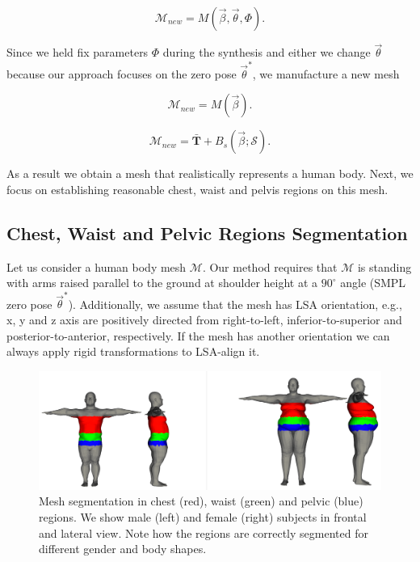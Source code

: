 \documentclass[runningheads, orivec]{llncs}
\begin{document}
\begin{equation}\label{eq:gen_mesh}
\mathcal{M}_{new} = M(\vec{\beta}, \vec{\theta}, \Phi).
\end{equation}

Since we held fix parameters $\Phi$ during the synthesis and either we change 
$\vec{\theta}$ because our approach focuses on the zero pose $\vec{\theta}^*$, 
we manufacture a new mesh

\begin{equation}\label{eq:gen_mesh_only_shape}
\mathcal{M}_{new} = M(\vec{\beta}).
\end{equation}

\begin{equation}\label{eq:gen_new_mesh}
\mathcal{M}_{new} = \mathbf{\bar{T}} + B_s(\vec{\beta}; \mathcal{S}).
\end{equation}

As a result we obtain a mesh that realistically represents a human body. Next, 
we focus on establishing reasonable chest, waist and pelvis regions on this 
mesh.

\subsection{Chest, Waist and Pelvic Regions 
Segmentation}\label{subsec:three_regions}

Let us consider a human body mesh $\mathcal{M}$. Our method requires that 
$\mathcal{M}$ is standing with arms raised 
parallel to the 
ground at shoulder height at a $90^\circ$ angle (SMPL zero pose
$\vec{\theta}^*$). Additionally, we assume that the mesh 
has LSA orientation, e.g., x, y and z axis are positively directed from 
right-to-left, inferior-to-superior and posterior-to-anterior, respectively. If 
the mesh has another orientation we can always apply rigid transformations to 
LSA-align it.

\begin{figure}[t]
	\begin{center}
		\includegraphics[width=\linewidth]{subjects_2_6_calvis_segmented.png}
	\end{center}
	\caption{Mesh segmentation in chest (red), waist (green) and pelvic (blue) 
	regions. We show male (left) and female (right) subjects in frontal and 
	lateral view. Note how the regions are correctly segmented for different 
	gender and body shapes.}
	\label{fig:mesh_segmented}
\end{figure}
\end{document}
